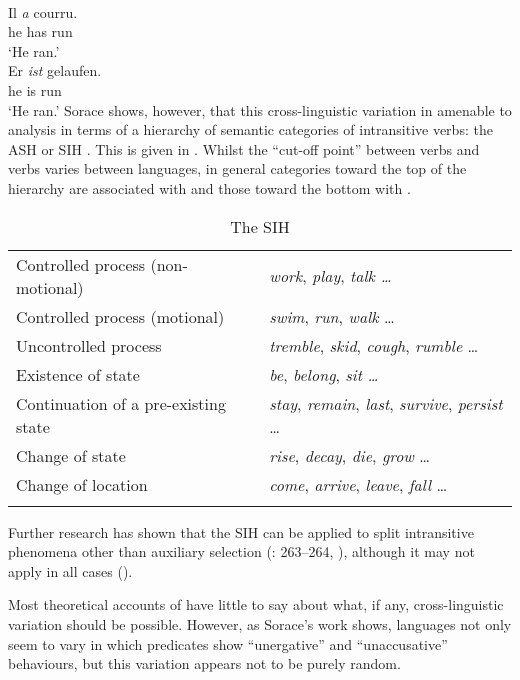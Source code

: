 \documentclass[output=paper]{langsci/langscibook}
\begin{document}
\ea {}\\
    \gll Il \textit{a} courru.\\
        he has run\\
    \glt \enquote*{He ran.}
\ex  {}\\
    \gll Er \textit{ist} gelaufen.\\
    he is run\\
    \glt \enquote*{He ran.}
\z
Sorace shows, however, that this cross-linguistic variation in amenable to
analysis in terms of a hierarchy of semantic categories of intransitive verbs:
the \gls{ASH} or \gls{SIH} \citep{SoraceShomura2001}.  This is given in
. Whilst the \enquote{cut-off point} between \HAVE{} verbs and
\BE{} verbs varies between languages, in general categories toward the top of the
hierarchy are associated with \HAVE{} and those toward the bottom with \BE.

\begin{table}
\begin{tabularx}{\textwidth}{QQ}
\lsptoprule
Controlled process (non-motional) & \emph{work}, \emph{play}, \emph{talk \dots{}}\\
Controlled process (motional) & \emph{swim}, \emph{run}, \emph{walk} \dots{}\\
Uncontrolled process & \emph{tremble}, \emph{skid}, \emph{cough}, \emph{rumble} \dots{}\\
Existence of state & \emph{be}, \emph{belong}, \emph{sit} \emph{\dots{}}\\
Continuation of a pre-existing state & \emph{stay}, \emph{remain}, \emph{last}, \emph{survive}, \emph{persist} \dots{}\\
Change of state & \emph{rise}, \emph{decay}, \emph{die}, \emph{grow} \dots{}\\
Change of location & \emph{come}, \emph{arrive}, \emph{leave}, \emph{fall} \dots{}\\
\lspbottomrule
\end{tabularx}
\caption{The \glsdesc{SIH} \parencite{Sorace2000}}\label{tab:key:19.2}
\end{table}
Further research has shown that the \gls{SIH} can be applied to split intransitive
phenomena other than auxiliary selection (\citealt{Sorace2004}: 263--264,
\citealt{Montrul2005}), although it may not apply in all cases
(\citealt{Baker2013,Baker2018}).

Most theoretical accounts of  have little to say about
what, if any, cross-linguistic variation should be possible. However, as
Sorace’s work shows, languages not only seem to vary in which predicates show
\enquote{unergative} and \enquote{unaccusative} behaviours, but this variation
appears not to be purely random.
\end{document}
